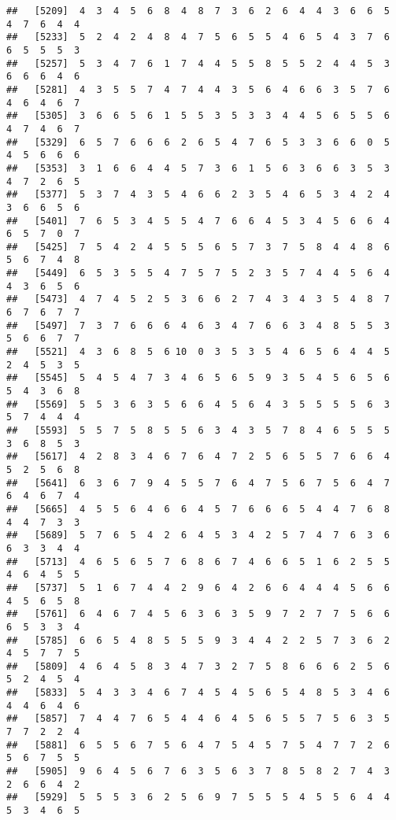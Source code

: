 \documentclass[
]{book}
\begin{document}
\begin{verbatim}
##   [5209]  4  3  4  5  6  8  4  8  7  3  6  2  6  4  4  3  6  6  5  4  7  6  4  4
##   [5233]  5  2  4  2  4  8  4  7  5  6  5  5  4  6  5  4  3  7  6  6  5  5  5  3
##   [5257]  5  3  4  7  6  1  7  4  4  5  5  8  5  5  2  4  4  5  3  6  6  6  4  6
##   [5281]  4  3  5  5  7  4  7  4  4  3  5  6  4  6  6  3  5  7  6  4  6  4  6  7
##   [5305]  3  6  6  5  6  1  5  5  3  5  3  3  4  4  5  6  5  5  6  4  7  4  6  7
##   [5329]  6  5  7  6  6  6  2  6  5  4  7  6  5  3  3  6  6  0  5  4  5  6  6  6
##   [5353]  3  1  6  6  4  4  5  7  3  6  1  5  6  3  6  6  3  5  3  4  7  2  6  5
##   [5377]  5  3  7  4  3  5  4  6  6  2  3  5  4  6  5  3  4  2  4  3  6  6  5  6
##   [5401]  7  6  5  3  4  5  5  4  7  6  6  4  5  3  4  5  6  6  4  6  5  7  0  7
##   [5425]  7  5  4  2  4  5  5  5  6  5  7  3  7  5  8  4  4  8  6  5  6  7  4  8
##   [5449]  6  5  3  5  5  4  7  5  7  5  2  3  5  7  4  4  5  6  4  4  3  6  5  6
##   [5473]  4  7  4  5  2  5  3  6  6  2  7  4  3  4  3  5  4  8  7  6  7  6  7  7
##   [5497]  7  3  7  6  6  6  4  6  3  4  7  6  6  3  4  8  5  5  3  5  6  6  7  7
##   [5521]  4  3  6  8  5  6 10  0  3  5  3  5  4  6  5  6  4  4  5  2  4  5  3  5
##   [5545]  5  4  5  4  7  3  4  6  5  6  5  9  3  5  4  5  6  5  6  5  4  3  6  8
##   [5569]  5  5  3  6  3  5  6  6  4  5  6  4  3  5  5  5  5  6  3  5  7  4  4  4
##   [5593]  5  5  7  5  8  5  5  6  3  4  3  5  7  8  4  6  5  5  5  3  6  8  5  3
##   [5617]  4  2  8  3  4  6  7  6  4  7  2  5  6  5  5  7  6  6  4  5  2  5  6  8
##   [5641]  6  3  6  7  9  4  5  5  7  6  4  7  5  6  7  5  6  4  7  6  4  6  7  4
##   [5665]  4  5  5  6  4  6  6  4  5  7  6  6  6  5  4  4  7  6  8  4  4  7  3  3
##   [5689]  5  7  6  5  4  2  6  4  5  3  4  2  5  7  4  7  6  3  6  6  3  3  4  4
##   [5713]  4  6  5  6  5  7  6  8  6  7  4  6  6  5  1  6  2  5  5  4  6  4  5  5
##   [5737]  5  1  6  7  4  4  2  9  6  4  2  6  6  4  4  4  5  6  6  4  5  6  5  8
##   [5761]  6  4  6  7  4  5  6  3  6  3  5  9  7  2  7  7  5  6  6  6  5  3  3  4
##   [5785]  6  6  5  4  8  5  5  5  9  3  4  4  2  2  5  7  3  6  2  4  5  7  7  5
##   [5809]  4  6  4  5  8  3  4  7  3  2  7  5  8  6  6  6  2  5  6  5  2  4  5  4
##   [5833]  5  4  3  3  4  6  7  4  5  4  5  6  5  4  8  5  3  4  6  4  4  6  4  6
##   [5857]  7  4  4  7  6  5  4  4  6  4  5  6  5  5  7  5  6  3  5  7  7  2  2  4
##   [5881]  6  5  5  6  7  5  6  4  7  5  4  5  7  5  4  7  7  2  6  5  6  7  5  5
##   [5905]  9  6  4  5  6  7  6  3  5  6  3  7  8  5  8  2  7  4  3  2  6  6  4  2
##   [5929]  5  5  5  3  6  2  5  6  9  7  5  5  5  4  5  5  6  4  4  5  3  4  6  5

\end{verbatim}
\end{document}
